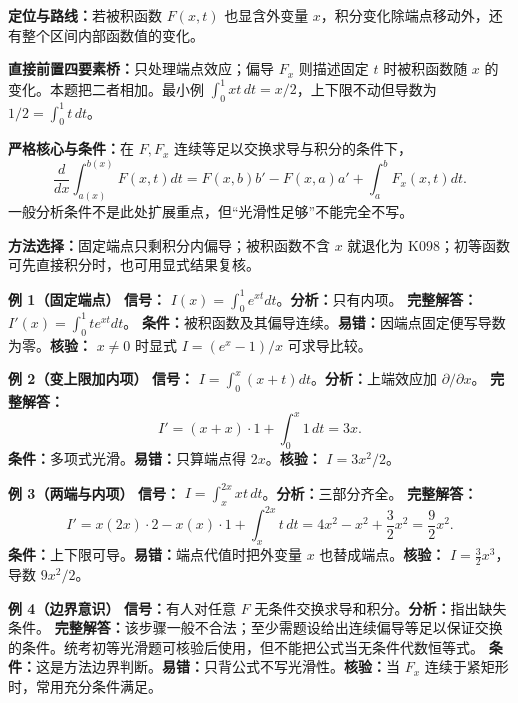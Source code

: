 
\par

\begin{knowledgeBox}
\textbf{定位与路线：}若被积函数 \(F(x,t)\) 也显含外变量 \(x\)，积分变化除端点移动外，还有整个区间内部函数值的变化。

\textbf{直接前置四要素桥：}只处理端点效应；偏导 \(F_x\) 则描述固定 \(t\) 时被积函数随 \(x\) 的变化。本题把二者相加。最小例 \(\int_0^1xt\,dt=x/2\)，上下限不动但导数为 \(1/2=\int_0^1t\,dt\)。

\textbf{严格核心与条件：}在 \(F,F_x\) 连续等足以交换求导与积分的条件下，
\[
\frac d{dx}\int_{a(x)}^{b(x)}F(x,t)dt
=F(x,b)b'-F(x,a)a'+\int_a^bF_x(x,t)dt.
\]
一般分析条件不是此处扩展重点，但“光滑性足够”不能完全不写。

\textbf{方法选择：}固定端点只剩积分内偏导；被积函数不含 \(x\) 就退化为 K098；初等函数可先直接积分时，也可用显式结果复核。

\textbf{例 1（固定端点）}\quad
\textbf{信号：} \(I(x)=\int_0^1e^{xt}dt\)。\textbf{分析：}只有内项。
\textbf{完整解答：} \(I'(x)=\int_0^1te^{xt}dt\)。
\textbf{条件：}被积函数及其偏导连续。\textbf{易错：}因端点固定便写导数为零。\textbf{核验：} \(x\ne0\) 时显式 \(I=(e^x-1)/x\) 可求导比较。

\textbf{例 2（变上限加内项）}\quad
\textbf{信号：} \(I=\int_0^x(x+t)dt\)。\textbf{分析：}上端效应加 \(\partial/\partial x\)。
\textbf{完整解答：}
\[
I'=(x+x)\cdot1+\int_0^x1\,dt=3x.
\]
\textbf{条件：}多项式光滑。\textbf{易错：}只算端点得 \(2x\)。\textbf{核验：} \(I=3x^2/2\)。

\textbf{例 3（两端与内项）}\quad
\textbf{信号：} \(I=\int_x^{2x}xt\,dt\)。\textbf{分析：}三部分齐全。
\textbf{完整解答：}
\[
I'=x(2x)\cdot2-x(x)\cdot1+\int_x^{2x}t\,dt
=4x^2-x^2+\frac32x^2=\frac92x^2.
\]
\textbf{条件：}上下限可导。\textbf{易错：}端点代值时把外变量 \(x\) 也替成端点。\textbf{核验：} \(I=\frac32x^3\)，导数 \(9x^2/2\)。

\textbf{例 4（边界意识）}\quad
\textbf{信号：}有人对任意 \(F\) 无条件交换求导和积分。\textbf{分析：}指出缺失条件。
\textbf{完整解答：}该步骤一般不合法；至少需题设给出连续偏导等足以保证交换的条件。统考初等光滑题可核验后使用，但不能把公式当无条件代数恒等式。
\textbf{条件：}这是方法边界判断。\textbf{易错：}只背公式不写光滑性。\textbf{核验：}当 \(F_x\) 连续于紧矩形时，常用充分条件满足。


\end{knowledgeBox}
